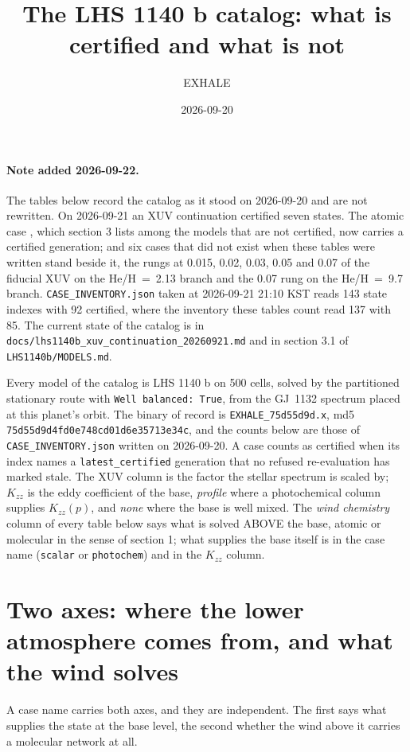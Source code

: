 \documentclass[11pt]{my_memo}
\title{The LHS 1140 b catalog: what is certified and what is not}
\author{EXHALE}
\date{2026-09-20}
\newcommand{\case}[1]{\seqsplit{#1}}
\begin{document}
\maketitle

\paragraph{Note added 2026-09-22.}
The tables below record the catalog as it stood on 2026-09-20 and are not
rewritten. On 2026-09-21 an XUV continuation certified seven states. The
atomic case \case{scalar\_x0.01\_kzz1e9/HeH2.13}, which section 3 lists among
the models that are not certified, now carries a certified generation; and six
cases that did not exist when these tables were written stand beside it, the
rungs at 0.015, 0.02, 0.03, 0.05 and 0.07 of the fiducial XUV on the
He/H~=~2.13 branch and the 0.07 rung on the He/H~=~9.7 branch.
\texttt{CASE\_INVENTORY.json} taken at 2026-09-21 21:10 KST reads 143 state
indexes with 92 certified, where the inventory these tables count read 137 with
85. The current state of the catalog is in
\texttt{docs/lhs1140b\_xuv\_continuation\_20260921.md} and in section 3.1 of
\texttt{LHS1140b/MODELS.md}.

\noindent
Every model of the catalog is LHS 1140 b on 500 cells, solved by the
partitioned stationary route with \texttt{Well balanced: True}, from the
GJ~1132 spectrum placed at this planet's orbit. The binary of record is
\texttt{EXHALE\_75d55d9d.x}, md5 \texttt{75d55d9d4fd0e748cd01d6e35713e34c},
and the counts below are those of \texttt{CASE\_INVENTORY.json} written on
2026-09-20. A case counts as certified when its index names a
\texttt{latest\_certified} generation that no refused re-evaluation has
marked stale. The XUV column is the factor the stellar spectrum is scaled
by; $K_{zz}$ is the eddy coefficient of the base, \emph{profile} where a
photochemical column supplies $K_{zz}(p)$, and \emph{none} where the base is
well mixed. The \emph{wind chemistry} column of every table below says what
is solved ABOVE the base, atomic or molecular in the sense of section 1; what
supplies the base itself is in the case name (\texttt{scalar} or
\texttt{photochem}) and in the $K_{zz}$ column.

\section{Two axes: where the lower atmosphere comes from, and what the wind solves}

A case name carries both axes, and they are independent. The first says what
supplies the state at the base level, the second whether the wind above it
carries a molecular network at all.
\end{document}
